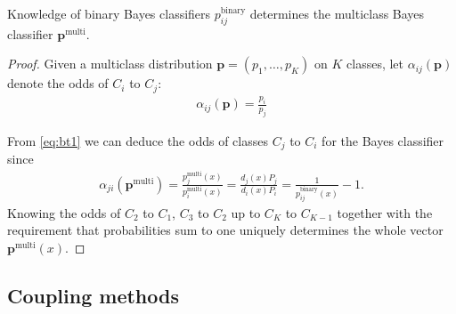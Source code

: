 \begin{prop}
	 \label{prop:binary2multi}
	 Knowledge of binary Bayes classifiers $p^\textrm{binary}_{ij}$ determines the multiclass Bayes classifier 
	 $\boldsymbol{p}^\textrm{multi}$.
\end{prop}
\begin{proof}
	Given a multiclass distribution $\boldsymbol{p} = (p_1, \ldots,p_K)$ on $K$ classes, let $\alpha_{ij}(\boldsymbol{p})$ denote the odds of $C_i$ to $C_j$:
	\begin{align}
		\alpha_{ij}(\boldsymbol{p}) = \frac{p_i}{p_j} \label{eq:alpha}
	\end{align}
	
	From \eqref{eq:bt1} we can deduce the odds of classes $C_j$ to $C_i$ for the Bayes classifier since
	\begin{align}
	\alpha_{ji}(\boldsymbol{p}^\textrm{multi}) = \frac{p_j^\textrm{multi}(x)}{p_i^\textrm{multi}(x)}
	=  \frac{d_j(x) P_j}{d_i(x) P_i} = \frac{1}{p^\textrm{binary}_{ij}(x)}- 1.
	\end{align}
	Knowing the odds of $C_2$ to $C_1$, $C_3$ to $C_2$ up to $C_{K}$ to $C_{K-1}$ together with the requirement that probabilities sum to one uniquely determines the whole vector $\boldsymbol{p}^\textrm{multi}(x)$.
\end{proof}


\subsection{Coupling methods}

